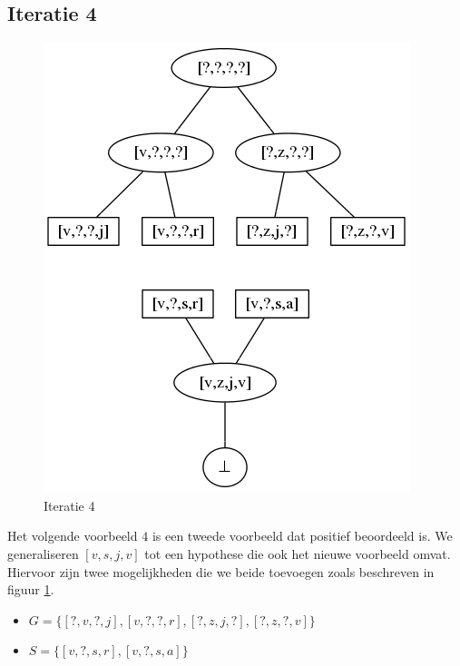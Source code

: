 \documentclass[alternative-exam.tex]{subfiles}
\begin{document}
\subsection{Iteratie 4}
\begin{figure}
[H]
\centering
\caption{Iteratie 4}
\label{iter_4}
\includegraphics[scale=0.5]{resources/graphs/iteration_4.png}
\end{figure}
Het volgende voorbeeld $4$ is een tweede voorbeeld dat positief beoordeeld is. We generaliseren $[v,s,j,v]$ tot een hypothese die ook het nieuwe voorbeeld omvat. Hiervoor zijn twee mogelijkheden die we beide toevoegen zoals beschreven in figuur \ref{iter_4}.
\begin{itemize}
\item $G = \{[?,v,?,j],[v,?,?,r],[?,z,j,?],[?,z,?,v]\}$
\item $S = \{[v,?,s,r],[v,?,s,a]\}$
\end{itemize}
\end{document}
